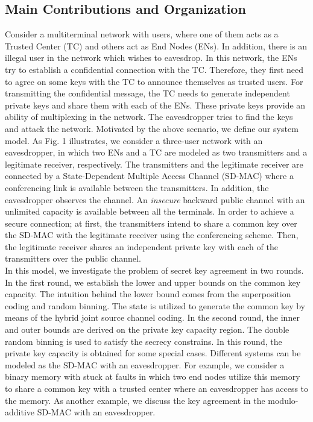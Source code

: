 \documentclass[conference,8pt]{IEEEtran}
\begin{document}
\subsection*{Main Contributions and Organization}{
Consider a multiterminal network with  users, where one of them acts as a Trusted Center (TC) and others act as End Nodes (ENs). In addition, there is an illegal user in the network which wishes to eavesdrop. In this network, the ENs try to establish a confidential connection with the TC. Therefore, they first need to agree on some keys with the TC to announce themselves as trusted users. For transmitting the confidential message, the TC needs to generate  independent private keys and share them with each of the ENs. These private keys provide an ability of multiplexing in the network. The eavesdropper tries to find the keys and attack the network. Motivated by the above scenario, we define our system model. As Fig. 1 illustrates, we consider a three-user network with an eavesdropper, in which two ENs and a TC are modeled as two transmitters and a legitimate receiver, respectively. The transmitters and the legitimate receiver are connected by a State-Dependent Multiple Access Channel (SD-MAC) where a conferencing link is available between the transmitters. In addition, the eavesdropper observes the channel. An \emph{insecure} backward public channel with an unlimited capacity is available between all the terminals. In order to achieve a secure connection; at first, the transmitters intend to share a common key over the SD-MAC with the legitimate receiver using the conferencing scheme. Then, the legitimate receiver shares an independent private key with each of the transmitters over the public channel.\\

In this model, we investigate the problem of secret key agreement in two rounds. In the first round, we establish the lower and upper bounds on the common key capacity. The intuition behind the lower bound comes from the superposition coding and random binning. The state is utilized to generate the common key by means of the hybrid joint source channel coding. In the second round, the inner and outer bounds are derived on the private key capacity region. The double random binning is used to satisfy the secrecy constrains. In this round, the private key capacity is obtained for some special cases. Different systems can be modeled as the SD-MAC with an eavesdropper. For example, we consider a binary memory with stuck at faults in which two end nodes utilize this memory to share a common key with a trusted center where an eavesdropper has access to the memory. As another example, we discuss the key agreement in the modulo-additive SD-MAC with an eavesdropper.\\

}
\end{document}
